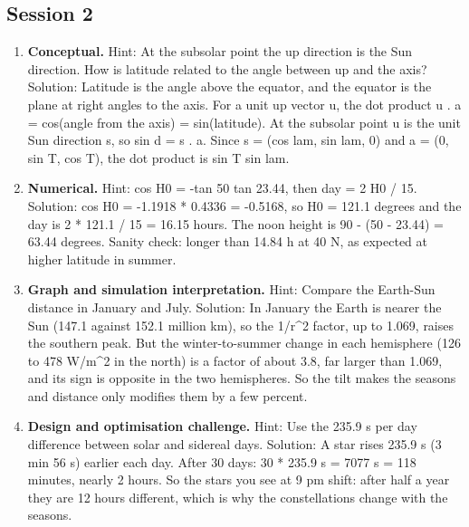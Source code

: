 \documentclass[11pt,a4paper]{article}
\begin{document}
\subsection*{Session 2}
\begin{enumerate}[nosep]
\item \textbf{Conceptual.} Hint: At the subsolar point the up direction is the Sun direction. How is latitude related to the angle between up and the axis? Solution: Latitude is the angle above the equator, and the equator is the plane at right angles to the axis. For a unit up vector u, the dot product u . a = cos(angle from the axis) = sin(latitude). At the subsolar point u is the unit Sun direction s, so sin d = s . a. Since s = (cos lam, sin lam, 0) and a = (0, sin T, cos T), the dot product is sin T sin lam.
\item \textbf{Numerical.} Hint: cos H0 = -tan 50 tan 23.44, then day = 2 H0 / 15. Solution: cos H0 = -1.1918 * 0.4336 = -0.5168, so H0 = 121.1 degrees and the day is 2 * 121.1 / 15 = 16.15 hours. The noon height is 90 - (50 - 23.44) = 63.44 degrees. Sanity check: longer than 14.84 h at 40 N, as expected at higher latitude in summer.
\item \textbf{Graph and simulation interpretation.} Hint: Compare the Earth-Sun distance in January and July. Solution: In January the Earth is nearer the Sun (147.1 against 152.1 million km), so the 1/r\textasciicircum{}2 factor, up to 1.069, raises the southern peak. But the winter-to-summer change in each hemisphere (126 to 478 W/m\textasciicircum{}2 in the north) is a factor of about 3.8, far larger than 1.069, and its sign is opposite in the two hemispheres. So the tilt makes the seasons and distance only modifies them by a few percent.
\item \textbf{Design and optimisation challenge.} Hint: Use the 235.9 s per day difference between solar and sidereal days. Solution: A star rises 235.9 s (3 min 56 s) earlier each day. After 30 days: 30 * 235.9 s = 7077 s = 118 minutes, nearly 2 hours. So the stars you see at 9 pm shift: after half a year they are 12 hours different, which is why the constellations change with the seasons.
\end{enumerate}
\end{document}
